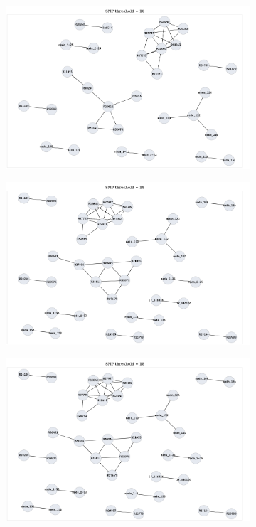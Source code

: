 \begin{figure}
     \centering
     \begin{subfigure}[b]{0.45\textwidth}
         \centering
         \includegraphics[width=\textwidth]{Appendix1/Figs/map_clusters_t16.png}
         \caption{}
     \end{subfigure}
     \hfill
     \begin{subfigure}[b]{0.45\textwidth}
         \centering
         \includegraphics[width=\textwidth]{Appendix1/Figs/map_clusters_t18.png}
         \caption{}
     \end{subfigure}
     \begin{subfigure}[b]{0.45\textwidth}
         \centering
         \includegraphics[width=\textwidth]{Appendix1/Figs/map_clusters_t18.png}

\end{subfigure}
\end{figure}
